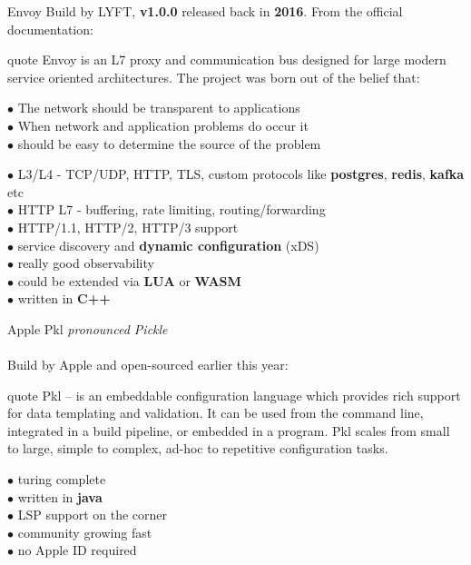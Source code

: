 \documentclass[11pt, aspectratio=169]{beamer}
\begin{document}
\begin{frame}{ Envoy}
	Build by LYFT, \textbf{v1.0.0} released back in \textbf{2016}.
	From the official documentation:

	\begin{block}{quote}
		Envoy is an L7 proxy and communication bus designed for large modern service oriented architectures.
		The project was born out of the belief that:
		\begin{description}
			\item [$\bullet$ The network should be transparent to applications]
			\item [$\bullet$ When network and application problems do occur it]
			\item [$\bullet$ should be easy to determine the source of the problem]
		\end{description}
	\end{block}

	\begin{description}
		\item [$\bullet$ L3/L4 - TCP/UDP, HTTP, TLS, custom protocols like
		      \textbf{postgres}, \textbf{redis}, \textbf{kafka} etc]
		\item [$\bullet$ HTTP L7 - buffering, rate limiting, routing/forwarding]
		\item [$\bullet$ HTTP/1.1, HTTP/2, HTTP/3 support]
		\item [$\bullet$ service discovery and \textbf{dynamic configuration} (xDS)]
		\item [$\bullet$ really good observability]
		\item [$\bullet$ could be extended via \textbf{LUA} or \textbf{WASM}]
		\item [$\bullet$ written in \textbf{C++}]
	\end{description}
\end{frame}

\begin{frame}{ Apple Pkl}
	\textit{pronounced Pickle}\\~\\
	Build by Apple and open-sourced earlier this year:

	\begin{block}{quote}
		Pkl -- is an embeddable configuration language which provides rich support
		for data templating and validation. It can be used from the command line,
		integrated in a build pipeline, or embedded in a program. Pkl scales
		from small to large, simple to complex, ad-hoc to repetitive configuration tasks.
	\end{block}

	\begin{description}
		\item [$\bullet$ turing complete]
		\item [$\bullet$ written in \textbf{java}]
		\item [$\bullet$ LSP support on the corner]
		\item [$\bullet$ community growing fast]
		\item [$\bullet$ no Apple ID required]
	\end{description}
\end{frame}
\end{document}
